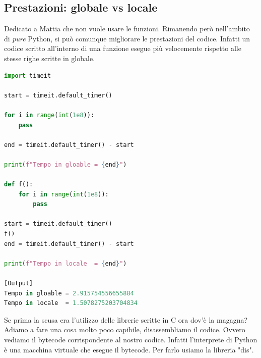 \documentclass[10pt,a4paper]{article}
\begin{document}
\subsection{Prestazioni: globale vs locale}
Dedicato a Mattia che non vuole usare le funzioni. Rimanendo però nell'ambito di \textit{pure} Python, si può comunque migliorare le prestazioni del codice. Infatti un codice scritto all'interno di una funzione esegue più velocemente rispetto alle stesse righe scritte in globale.
\begin{lstlisting}[language=Python]
import timeit

start = timeit.default_timer()

for i in range(int(1e8)):
    pass

end = timeit.default_timer() - start

print(f"Tempo in gloable = {end}")

def f():
    for i in range(int(1e8)):
        pass

start = timeit.default_timer()
f()
end = timeit.default_timer() - start

print(f"Tempo in locale  = {end}")

[Output]
Tempo in gloable = 2.915754556655884
Tempo in locale  = 1.5078275203704834
\end{lstlisting}
Se prima la scusa era l'utilizzo delle librerie scritte in C ora dov'è la magagna? Adiamo a fare una cosa molto poco capibile, disassembliamo il codice. Ovvero vediamo il bytecode corrispondente al nostro codice. Infatti l'interprete di Python è una macchina virtuale che esegue il bytecode. Per farlo usiamo la libreria "dis".
\end{document}
